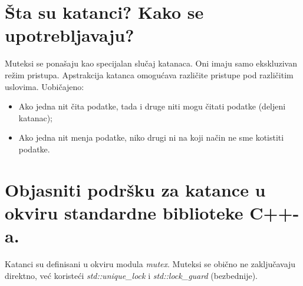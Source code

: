 \documentclass[a4paper]{article}
\begin{document}
\section{Šta su katanci? Kako se upotrebljavaju?}
  Muteksi se ponašaju kao specijalan slučaj katanaca. Oni imaju samo ekskluzivan režim pristupa. 
  Apstrakcija katanca omogućava različite pristupe pod različitim uslovima. Uobičajeno:
  \begin{itemize}
    \item Ako jedna nit čita podatke, tada i druge niti mogu čitati podatke (deljeni katanac);
    \item Ako jedna nit menja podatke, niko drugi ni na koji način ne sme kotistiti podatke.
  \end{itemize}
  
\section{Objasniti podršku za katance u okviru standardne biblioteke C++-a.}
  Katanci su definisani u okviru modula \textit{mutex}. Muteksi se obično
  ne zaključavaju direktno, već koristeći \textit{std::unique\_lock} i \textit{std::lock\_guard}
  (bezbednije). \cite{cppref_mutex}
\end{document}
